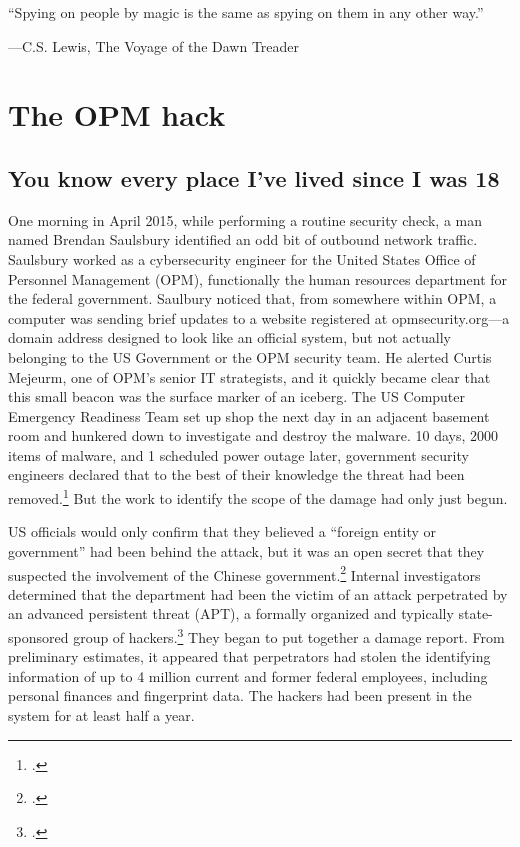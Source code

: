 \documentclass{memoir}
\begin{document}
\begin{refsegment}
\epigraph{``Spying on people by magic is the same as spying on them in any other way.''}{---\textup{C.S. Lewis}, The Voyage of the Dawn Treader}

\section{The OPM hack}
\subsection{You know every place I've lived since I was 18}
One morning in April 2015, while performing a routine security check, a man named Brendan Saulsbury identified an odd bit of outbound network traffic. Saulsbury worked as a cybersecurity engineer for the United States Office of Personnel Management (OPM), functionally the human resources department for the federal government. Saulbury noticed that, from somewhere within OPM, a computer was sending brief updates to a website registered at opmsecurity.org---a domain address designed to look like an official system, but not actually belonging to the US Government or the OPM security team. He alerted Curtis Mejeurm, one of OPM's senior IT strategists, and it quickly became clear that this small beacon was the surface marker of an iceberg. The US Computer Emergency Readiness Team set up shop the next day in an adjacent basement room and hunkered down to investigate and destroy the malware. 10 days, 2000 items of malware, and 1 scheduled power outage later, government security engineers declared that to the best of their knowledge the threat had been removed.\footcite{koerner_inside_2016} But the work to identify the scope of the damage had only just begun.

US officials would only confirm that they believed a ``foreign entity or government'' had been behind the attack, but it was an open secret that they suspected the involvement of the Chinese government.\footcite{spetalnick_china_2015} Internal investigators determined that the department had been the victim of an attack perpetrated by an advanced persistent threat (APT), a formally organized and typically state-sponsored group of hackers.\footcite[Attributing a cyberattack is difficult because hackers have endless means to obscure their orgins. In this case, however, the first clue that investigators found was left there on purpose. A particularly effective group of hackers tied to China has made it a calling card of sorts to register sites using the names of members of Marvel's comic book superhero group, The Avengers. In this case, opmsecurity.org was registered under the name ``Steve Rogers,'' better known as Captain America.]{koerner_inside_2016} They began to put together a damage report. From preliminary estimates, it appeared that perpetrators had stolen the identifying information of up to 4 million current and former federal employees, including personal finances and fingerprint data. The hackers had been present in the system for at least half a year.


\end{refsegment}
\end{document}
